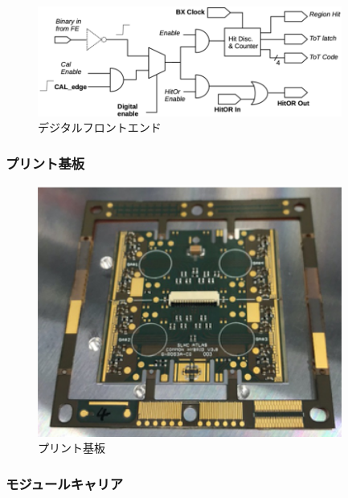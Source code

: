 \begin{figure}[bpt]\centering
\includegraphics[width=10cm]{digital_fe}
\caption[デジタルフロントエンド]{デジタルフロントエンド\cite{2-1}}
\label{digital_fe}
\end{figure}

\subsubsection{プリント基板}

\begin{figure}[bpt]\centering
\includegraphics[width=10cm]{pcb}
\caption[プリント基板]{プリント基板}
\label{pcb}
\end{figure}

\subsubsection{モジュールキャリア}


